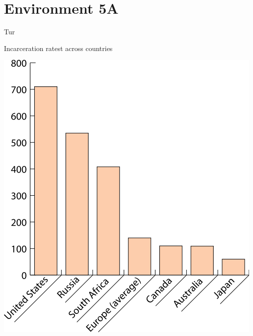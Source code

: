 \section{Environment 5A}

\lipsum[1-2]

\begin{map}{T}{ur}
\caption{Incarceration ratest across countries}
\label{chart:incarceration}
\includegraphics[width=\chartwidth,height=\chartheight]{incarceration}  
\end{map}

